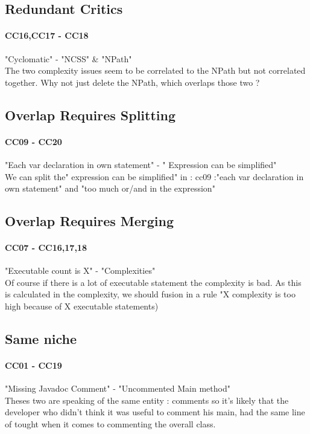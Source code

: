 \documentclass{article}
\begin{document}
\subsection{Redundant Critics}
\paragraph{CC16,CC17 - CC18 }
 "Cyclomatic" - "NCSS" \& "NPath" \\
The two complexity issues seem to be correlated to the NPath but not correlated together. Why not just delete the NPath, which overlaps those two ?

\subsection{Overlap Requires Splitting}
\paragraph{CC09  - CC20}
"Each var declaration in own statement" - " Expression can be simplified" \\
We can split the" expression can be simplified" in : cc09 :"each var declaration in own statement" and "too much or/and in the expression" 

\subsection{Overlap Requires Merging}
\paragraph{CC07 - CC16,17,18}
"Executable count is X" -  "Complexities"\\
Of course if there is a lot of executable statement the complexity is bad. As this is calculated in the complexity, we should fusion in a rule "X complexity is too high because of X executable statements) 





\subsection{Same niche}
\paragraph{CC01 - CC19} 
 "Missing Javadoc Comment" - "Uncommented Main method" \\
Theses two are speaking of the same entity : comments so it's likely that the developer who didn't think it was useful to comment his main, had the same line of tought when it comes to commenting the overall class.
\end{document}
